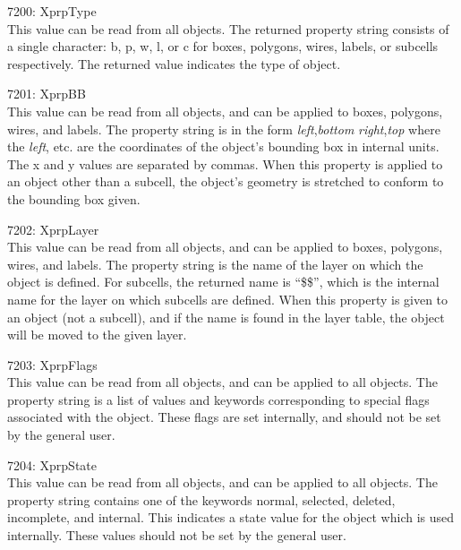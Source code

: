 \begin{description}
\item{7200: {\et XprpType}}\\
This value can be read from all objects.  The returned property string
consists of a single character:  {\vt b}, {\vt p}, {\vt w}, {\vt l},
or {\vt c} for boxes, polygons, wires, labels, or subcells
respectively.  The returned value indicates the type of object.

\item{7201: {\et XprpBB}}\\
This value can be read from all objects, and can be applied to boxes,
polygons, wires, and labels.  The property string is in the form {\it
left\/},{\it bottom} {\it right\/},{\it top} where the {\it left\/},
etc.  are the coordinates of the object's bounding box in internal
units.  The {\et x} and {\et y} values are separated by commas.  When
this property is applied to an object other than a subcell, the
object's geometry is stretched to conform to the bounding box given.

\item{7202: {\et XprpLayer}}\\
This value can be read from all objects, and can be applied to boxes,
polygons, wires, and labels.  The property string is the name of the
layer on which the object is defined.  For subcells, the returned name
is ``{\vt \$\$}'', which is the internal name for the layer on which
subcells are defined.  When this property is given to an object (not a
subcell), and if the name is found in the layer table, the object will
be moved to the given layer.

\item{7203: {\et XprpFlags}}\\
This value can be read from all objects, and can be applied to all
objects.  The property string is a list of values and keywords
corresponding to special flags associated with the object.  These
flags are set internally, and should not be set by the general user.

\item{7204: {\et XprpState}}\\
This value can be read from all objects, and can be applied to all
objects.  The property string contains one of the keywords {\vt
normal}, {\vt selected}, {\vt deleted}, {\vt incomplete}, and {\vt
internal}.  This indicates a state value for the object which is used
internally.  These values should not be set by the general user.


\end{description}
